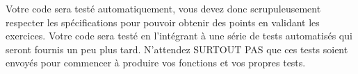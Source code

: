 


\noindent Votre code sera testé automatiquement, vous devez donc scrupuleusement respecter les spécifications pour pouvoir obtenir des points en validant les exercices.
%
Votre code sera testé en l'intégrant à une série de tests automatisés qui seront fournis un peu plus tard.
N'attendez SURTOUT PAS que ces tests soient envoyés pour commencer à produire vos fonctions et vos propres tests.
%

%
%
%
%
%

\bigskip

